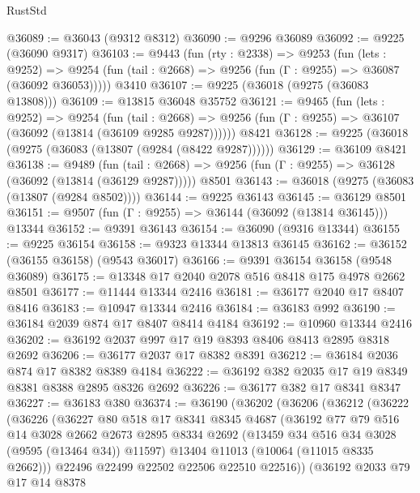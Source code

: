 \begin{lexlean}{RustStd}
\begin{coremodule}
@36089 := @36043 (@9312 @8312)
@36090 := @9296 @36089
@36092 := @9225 (@36090 @9317)
@36103 := @9443
    (fun (rty : @2338) =>
    @9253
      (fun (lets : @9252) =>
      @9254 (fun (tail : @2668) => @9256 (fun (Γ : @9255) => @36087 (@36092 @36053)))))
    @3410
@36107 := @9225 (@36018 (@9275 (@36083 @13808)))
@36109 := @13815 @36048 @35752
@36121 := @9465
    (fun (lets : @9252) =>
    @9254
      (fun (tail : @2668) =>
      @9256 (fun (Γ : @9255) => @36107 (@36092 (@13814 (@36109 @9285 @9287))))))
    @8421
@36128 := @9225 (@36018 (@9275 (@36083 (@13807 (@9284 (@8422 @9287))))))
@36129 := @36109 @8421
@36138 := @9489
    (fun (tail : @2668) => @9256 (fun (Γ : @9255) => @36128 (@36092 (@13814 (@36129 @9287)))))
    @8501
@36143 := @36018 (@9275 (@36083 (@13807 (@9284 @8502))))
@36144 := @9225 @36143
@36145 := @36129 @8501
@36151 := @9507 (fun (Γ : @9255) => @36144 (@36092 (@13814 @36145))) @13344
@36152 := @9391 @36143
@36154 := @36090 (@9316 @13344)
@36155 := @9225 @36154
@36158 := @9323 @13344 @13813 @36145
@36162 := @36152 (@36155 @36158) (@9543 @36017)
@36166 := @9391 @36154 @36158 (@9548 @36089)
@36175 := @13348 @17 @2040 @2078 @516 @8418 @175 @4978 @2662 @8501
@36177 := @11444 @13344 @2416
@36181 := @36177 @2040 @17 @8407 @8416
@36183 := @10947 @13344 @2416
@36184 := @36183 @992
@36190 := @36184 @2039 @874 @17 @8407 @8414 @4184
@36192 := @10960 @13344 @2416
@36202 := @36192 @2037 @997 @17 @19 @8393 @8406 @8413 @2895 @8318 @2692
@36206 := @36177 @2037 @17 @8382 @8391
@36212 := @36184 @2036 @874 @17 @8382 @8389 @4184
@36222 := @36192 @382 @2035 @17 @19 @8349 @8381 @8388 @2895 @8326 @2692
@36226 := @36177 @382 @17 @8341 @8347
@36227 := @36183 @380
@36374 := @36190
    (@36202
      (@36206
        (@36212
          (@36222
            (@36226
              (@36227
                @80
                @518
                @17
                @8341
                @8345
                @4687
                (@36192
                  @77
                  @79
                  @516
                  @14
                  @3028
                  @2662
                  @2673
                  @2895
                  @8334
                  @2692
                  (@13459 @34 @516 @34 @3028 (@9595 (@13464 @34)) @11597)
                  @13404
                  @11013
                  (@10064 (@11015 @8335 @2662)))
                @22496
                @22499
                @22502
                @22506
                @22510
                @22516))
            (@36192
              @2033
              @79
              @17
              @14
              @8378

\end{coremodule}
\end{lexlean}
